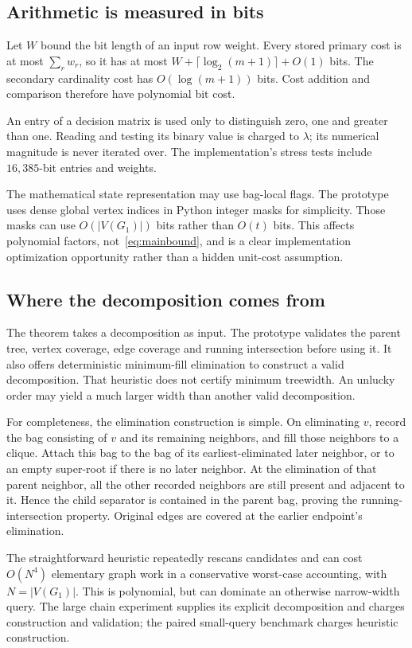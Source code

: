\documentclass[11pt]{article}
\theoremstyle{definition}\newtheorem{definition}[theorem]{Definition}
\theoremstyle{remark}\newtheorem{remark}[theorem]{Remark}
\begin{document}
\subsection{Arithmetic is measured in bits}
Let $W$ bound the bit length of an input row weight. Every stored primary cost is at most $\sum_r w_r$, so it has at most $W+\lceil\log_2(m+1)\rceil+O(1)$ bits. The secondary cardinality cost has $O(\log(m+1))$ bits. Cost addition and comparison therefore have polynomial bit cost.

An entry of a decision matrix is used only to distinguish zero, one and greater than one. Reading and testing its binary value is charged to $\lambda$; its numerical magnitude is never iterated over. The implementation's stress tests include $16{,}385$-bit entries and weights.

The mathematical state representation may use bag-local flags. The prototype uses dense global vertex indices in Python integer masks for simplicity. Those masks can use $O(|V(G_1)|)$ bits rather than $O(t)$ bits. This affects polynomial factors, not~\eqref{eq:mainbound}, and is a clear implementation optimization opportunity rather than a hidden unit-cost assumption.

\subsection{Where the decomposition comes from}
The theorem takes a decomposition as input. The prototype validates the parent tree, vertex coverage, edge coverage and running intersection before using it. It also offers deterministic minimum-fill elimination to construct a valid decomposition. That heuristic does not certify minimum treewidth. An unlucky order may yield a much larger width than another valid decomposition.

For completeness, the elimination construction is simple. On eliminating $v$, record the bag consisting of $v$ and its remaining neighbors, and fill those neighbors to a clique. Attach this bag to the bag of its earliest-eliminated later neighbor, or to an empty super-root if there is no later neighbor. At the elimination of that parent neighbor, all the other recorded neighbors are still present and adjacent to it. Hence the child separator is contained in the parent bag, proving the running-intersection property. Original edges are covered at the earlier endpoint's elimination.

The straightforward heuristic repeatedly rescans candidates and can cost $O(N^4)$ elementary graph work in a conservative worst-case accounting, with $N=|V(G_1)|$. This is polynomial, but can dominate an otherwise narrow-width query. The large chain experiment supplies its explicit decomposition and charges construction and validation; the paired small-query benchmark charges heuristic construction.
\end{document}

